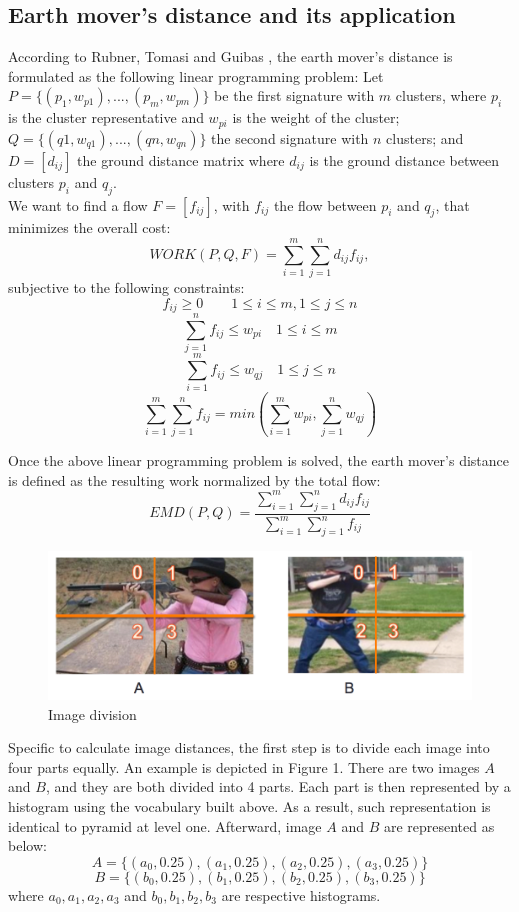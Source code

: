 \subsection{Earth mover's distance and its application}
According to Rubner, Tomasi and Guibas \cite{rubner2000earth}, the earth mover's distance is formulated as the following linear programming problem: Let $P = \{(p_1, w_{p1} ), . . . , (p_m , w_{pm} )\}$ be the first signature with $m$ clusters, where $p_i$ is the cluster representative and $w_{pi}$ is the weight of the cluster; $Q=\{(q1,w_{q1}),...,(qn,w_{qn})\}$ the second signature with $n$ clusters; and $D = [d_{ij}]$ the ground distance matrix where $d_{ij}$ is the ground distance between clusters $p_i$ and $q_j$. \\

\noindent We want to find a flow $F = [f_{ij}]$, with $f_{ij}$ the flow between $p_i$ and $q_j$, that minimizes the overall cost: $$WORK(P , Q, F) = \sum_{i=1}^{m}\sum_{j=1}^{n}d_{ij}f_{ij},$$ subjective to the following constraints: 
$$f_{ij} \geq 0 \quad \quad 1 \leq i \leq m,  1 \leq j \leq n $$ 
$$\sum_{j=1}^n f_{ij} \leq w_{pi} \quad 1 \leq i \leq m$$
$$\sum_{i=1}^m f_{ij} \leq w_{qj} \quad 1 \leq j \leq n$$
$$\sum_{i=1}^{m} \sum_{j=1}^n f_{ij} = min(\sum_{i=1}^m w_{pi}, \sum_{j=1}^n w_{qj})$$

\noindent Once the above linear programming problem is solved, the earth mover's distance is defined as the resulting work normalized by the total flow:
$$EMD(P, Q) = \frac{\sum_{i=1}^m \sum_{j=1}^n d_{ij} f_{ij}}{\sum_{i=1}^m\sum_{j=1}^n f_{ij}}$$

\begin{figure}[!ht]
\centering
	\includegraphics[width=1\textwidth]{./image_EMD_Sample.png}
\caption{Image division}
\end{figure}

\noindent Specific to calculate image distances, the first step is to divide each image into four parts equally. An example is depicted in Figure 1. There are two images $A$ and $B$, and they are both divided into 4 parts. Each part is then represented by a histogram using the vocabulary built above. As a result, such representation is identical to pyramid at level one. Afterward, image $A$ and $B$ are represented as below:
	$$A = \{(a_0, 0.25), (a_1, 0.25), (a_2, 0.25), (a_3, 0.25)\}$$
	$$B = \{(b_0, 0.25), (b_1, 0.25), (b_2, 0.25), (b_3, 0.25)\}$$
where $a_0, a_1, a_2, a_3$ and $b_0, b_1, b_2, b_3$ are respective histograms.\\

